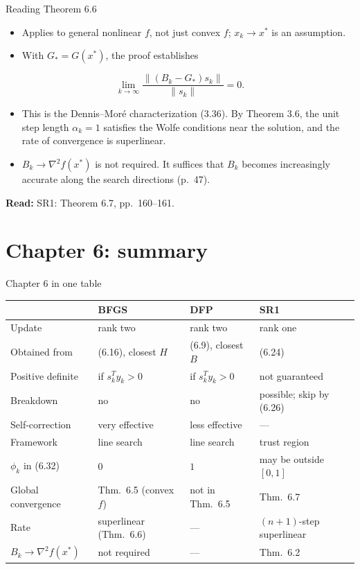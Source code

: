 \documentclass[aspectratio=169,12pt]{beamer}
\newcommand{\xs}{x^{*}}
\newcommand{\hessf}{\nabla^{2} f}
\newcommand{\readbook}[1]{{\color{red}\textbf{Read:} #1}}
\begin{document}
\begin{frame}{Reading Theorem 6.6}
  \begin{itemize}\setlength\itemsep{0.45em}
    \item Applies to general nonlinear $f$, not just convex $f$; $x_{k}\to\xs$ is an assumption.
    \item With $G_{*}=G(\xs)$, the proof establishes
  \end{itemize}
  \[ \lim_{k\to\infty}\frac{\|(B_{k}-G_{*})s_{k}\|}{\|s_{k}\|}=0 . \]
  \begin{itemize}\setlength\itemsep{0.45em}
    \item This is the Dennis--Mor\'e characterization (3.36). By Theorem 3.6, the unit step
      length $\alpha_{k}=1$ satisfies the Wolfe conditions near the solution, and the rate of
      convergence is superlinear.
    \item \alert{$B_{k}\to\hessf(\xs)$ is not required.} It suffices that $B_{k}$ becomes increasingly
      accurate along the search directions (p.~47).
  \end{itemize}
  \readbook{SR1: Theorem 6.7, pp.~160--161.}
\end{frame}

\section{Chapter 6: summary}

\begin{frame}{Chapter 6 in one table}
  \begin{center}
  \small\setlength\tabcolsep{5pt}
  \begin{tabular}{llll}
    \toprule
    & BFGS & DFP & SR1 \\
    \midrule
    Update & rank two & rank two & rank one \\
    Obtained from & (6.16), closest $H$ & (6.9), closest $B$ & (6.24) \\
    Positive definite & if $s_{k}^{T}y_{k}>0$ & if $s_{k}^{T}y_{k}>0$ & not guaranteed \\
    Breakdown & no & no & possible; skip by (6.26) \\
    Self-correction & very effective & less effective & --- \\
    Framework & line search & line search & trust region \\
    $\phi_{k}$ in (6.32) & $0$ & $1$ & may be outside $[0,1]$ \\
    Global convergence & Thm.~6.5 (convex $f$) & not in Thm.~6.5 & Thm.~6.7 \\
    Rate & superlinear (Thm.~6.6) & --- & $(n{+}1)$-step superlinear \\
    $B_{k}\to\hessf(\xs)$ & not required & --- & Thm.~6.2 \\
    \bottomrule
  \end{tabular}
  \end{center}

\end{frame}
\end{document}
